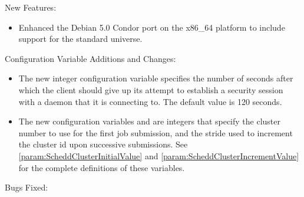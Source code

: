 \noindent New Features:

\begin{itemize}

\item Enhanced the Debian 5.0 Condor port on the x86\_64 platform to 
include support for the standard universe. 

\end{itemize}

\noindent Configuration Variable Additions and Changes:

\begin{itemize}

\item The new integer configuration variable
   specifies the
  number of seconds after which the client should give up its attempt to
  establish a security session with a daemon that it is connecting to.
  The default value is 120 seconds.

\item The new configuration variables 
  and  are integers that 
  specify the cluster number to use for the first job submission,
  and the stride used to increment the cluster id upon successive submissions.
  See \ref{param:ScheddClusterInitialValue} and
  \ref{param:ScheddClusterIncrementValue}
  for the complete definitions of these variables.

\end{itemize}

\noindent Bugs Fixed:

